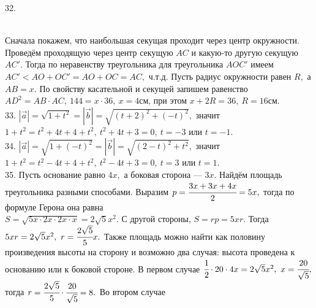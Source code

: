 \documentclass[12pt]{article}
\begin{document}
32. \begin{figure}[ht!]
\end{figure}\\
Сначала покажем, что наибольшая секущая проходит через центр окружности. Проведём проходящую через центр секущую $AC$ и какую-то другую секущую $AC'.$ Тогда по неравенству треугольника для треугольника $AOC'$ имеем $AC'<AO+OC'=AO+OC=AC,$ ч.т.д. Пусть радиус окружности равен $R,$ а $AB=x.$ По свойству касательной и секущей
запишем равенство $AD^2=AB\cdot AC,\ 144=x\cdot 36,\ x=4$см, при этом $x+2R=36,\ R=16$см.\\
33. $|\vec{a}|=\sqrt{1+t^2}=|\vec{b}|=\sqrt{(t+2)^2+(-t)^2},$ значит $1+t^2=t^2+4t+4+t^2,\ t^2+4t+3=0,\ t=-3$ или $t=-1.$\\
34. $|\vec{a}|=\sqrt{1+(-t)^2}=|\vec{b}|=\sqrt{(2-t)^2+t^2},$ значит $1+t^2=t^2-4t+4+t^2,\ t^2-4t+3=0,\ t=3$ или $t=1.$\\
35. Пусть основание равно $4x,$ а боковая сторона --- $3x.$ Найдём площадь треугольника разными способами. Выразим $p=\cfrac{3x+3x+4x}{2}=5x,$ тогда по формуле Герона она равна \\$S=\sqrt{5x\cdot2x\cdot 2x\cdot x}=2\sqrt{5}x^2.$ С другой стороны, $S=rp=5xr.$ Тогда $5xr=2\sqrt{5}x^2,\ r=\cfrac{2\sqrt{5}}{5}x.$ Также площадь можно найти как половину произведения высоты на сторону и возможно два случая: высота проведена к основанию или к боковой стороне. В первом случае $\cfrac{1}{2}\cdot20\cdot4x=2\sqrt{5}x^2,\ x=\cfrac{20}{\sqrt{5}},$ тогда $r=\cfrac{2\sqrt{5}}{5}\cdot\cfrac{20}{\sqrt{5}}=8.$ Во втором случае
\end{document}
